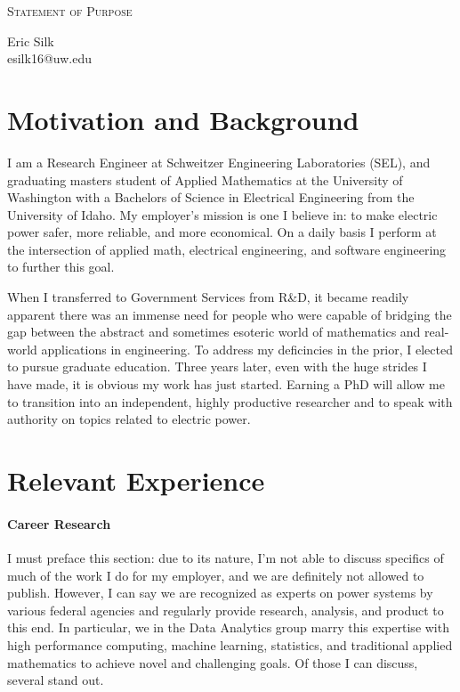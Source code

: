 \documentclass[letterpaper]{article}
\makeatletter
\newcommand{\soptitle}{Statement of Purpose}
\newcommand{\yourname}{Eric Silk}
\newcommand{\youremail}{esilk16@uw.edu}
\makeatother
\begin{document}
\begin{center}{\huge \scshape \soptitle}\end{center}
\begin{center}\vspace{0.2em} {\Large \yourname\\}
  {\youremail}\end{center}

\section*{Motivation and Background}
I am a Research Engineer at Schweitzer Engineering Laboratories (SEL), and graduating masters
student of Applied Mathematics at the University of Washington with a Bachelors of Science
in Electrical Engineering from the University of Idaho. My employer's mission is
one I believe in: to make electric power safer, more reliable, and more economical. On a daily
basis I perform at the intersection of applied math, electrical engineering, and software
engineering to further this goal.

When I transferred to Government Services from R\&D, it became readily apparent there was
an immense need for people who were capable of bridging the gap between the abstract and
sometimes esoteric world of mathematics and real-world applications in engineering.
To address my deficincies in the prior, I elected to pursue graduate education. 
Three years later, even with the huge strides I have made, it is obvious my work has
just started. Earning a PhD will allow me to transition into an independent, highly
productive researcher and to speak with authority on topics related to electric power.

\section*{Relevant Experience}
\paragraph{Career Research}
I must preface this section: due to its nature, I'm not able to discuss specifics of
much of the work I do for my employer, and we are definitely not allowed to publish.
However, I can say we are recognized as experts
on power systems by various federal agencies and regularly provide research, analysis,
and product to this end. In particular, we in the Data Analytics group marry this expertise
with high performance computing, machine learning, statistics, and traditional applied
mathematics to achieve novel and challenging goals. Of those I can discuss, several stand out.
\end{document}

